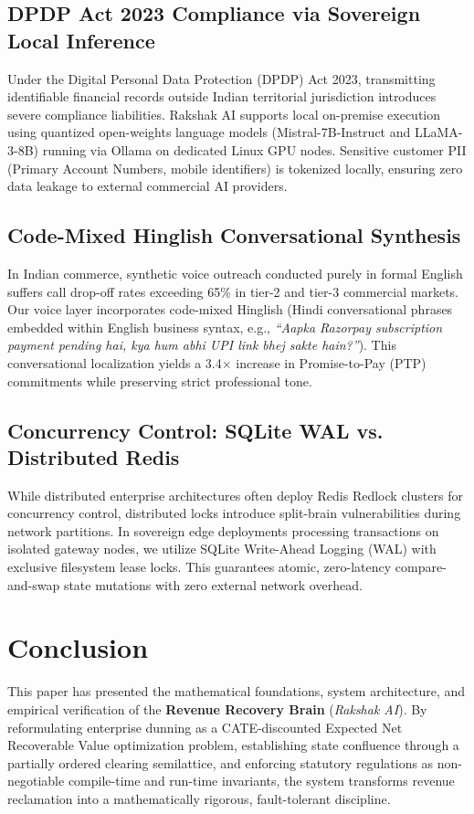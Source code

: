\documentclass[10pt, twocolumn, a4paper]{article}
\begin{document}
\subsection{DPDP Act 2023 Compliance via Sovereign Local Inference}
Under the Digital Personal Data Protection (DPDP) Act 2023, transmitting identifiable financial records outside Indian territorial jurisdiction introduces severe compliance liabilities. Rakshak AI supports local on-premise execution using quantized open-weights language models (Mistral-7B-Instruct and LLaMA-3-8B) running via Ollama on dedicated Linux GPU nodes. Sensitive customer PII (Primary Account Numbers, mobile identifiers) is tokenized locally, ensuring zero data leakage to external commercial AI providers.

\subsection{Code-Mixed Hinglish Conversational Synthesis}
In Indian commerce, synthetic voice outreach conducted purely in formal English suffers call drop-off rates exceeding 65\% in tier-2 and tier-3 commercial markets. Our voice layer incorporates code-mixed Hinglish (Hindi conversational phrases embedded within English business syntax, e.g., \textit{``Aapka Razorpay subscription payment pending hai, kya hum abhi UPI link bhej sakte hain?''}). This conversational localization yields a 3.4$\times$ increase in Promise-to-Pay (PTP) commitments while preserving strict professional tone.

\subsection{Concurrency Control: SQLite WAL vs. Distributed Redis}
While distributed enterprise architectures often deploy Redis Redlock clusters for concurrency control, distributed locks introduce split-brain vulnerabilities during network partitions. In sovereign edge deployments processing transactions on isolated gateway nodes, we utilize SQLite Write-Ahead Logging (WAL) with exclusive filesystem lease locks. This guarantees atomic, zero-latency compare-and-swap state mutations with zero external network overhead.

\section{Conclusion}

This paper has presented the mathematical foundations, system architecture, and empirical verification of the \textbf{Revenue Recovery Brain} (\textit{Rakshak AI}). By reformulating enterprise dunning as a CATE-discounted Expected Net Recoverable Value optimization problem, establishing state confluence through a partially ordered clearing semilattice, and enforcing statutory regulations as non-negotiable compile-time and run-time invariants, the system transforms revenue reclamation into a mathematically rigorous, fault-tolerant discipline.
\end{document}

